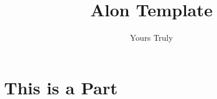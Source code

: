 \documentclass[Alon2,singlecolor,11pt]{Alon}
\title{Alon Template}
\author{Yours Truly}
\begin{document}
\frontmatter



\halftitle

\booktitle

\locpage


\cleardoublepage
\setcounter{page}{7} %
\tableofcontents






\part{This is a Part}


\setcounter{chapter}{10}






\printindex
\cleardoublepage
\end{document}
